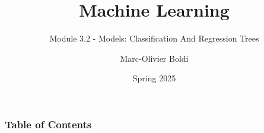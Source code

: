 
\title{Machine Learning}
\subtitle{Module 3.2 - Models: Classification And Regression Trees}
\author[MOB]{Marc-Olivier Boldi}
\date{Spring 2025}

\begin{frame}
  \titlepage
\end{frame}
\begin{frame}
\frametitle{Table of Contents}
	\tableofcontents
\end{frame}
